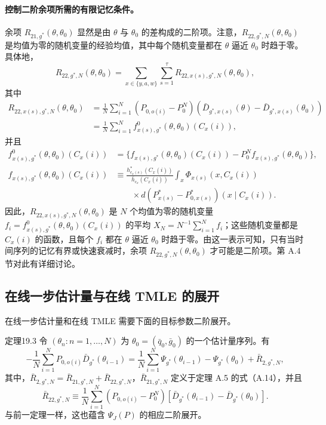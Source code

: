 \paragraph{控制二阶余项所需的有限记忆条件。}
余项 $R_{21,g^*}(\theta,\theta_0)$ 显然是由 $\theta$ 与 $\theta_0$ 的差构成的二阶项。注意，$R_{22,g^*,N}(\theta,\theta_0)$ 是均值为零的随机变量的经验均值，其中每个随机变量都在 $\theta$ 逼近 $\theta_0$ 时趋于零。具体地，
\[
 R_{22,g^*,N}(\theta,\theta_0)
 =\sum_{x\in\{y,a,w\}}\sum_{s=1}^{\tau}
 R_{22,x(s),g^*,N}(\theta,\theta_0),
\]
其中
\[
\begin{aligned}
 R_{22,x(s),g^*,N}(\theta,\theta_0)
 &=\frac1N\sum_{i=1}^N(P_{0,o(i)}-P_0^N)
 (\bar D_{g^*,x(s)}(\theta)-\bar D_{g^*,x(s)}(\theta_0))\\
 &=\frac1N\sum_{i=1}^N f^0_{x(s),g^*}(\theta,\theta_0)(C_x(i)),
\end{aligned}
\]
并且
\[
\begin{aligned}
 f^0_{x(s),g^*}(\theta,\theta_0)(C_x(i))
 &=\{f_{x(s),g^*}(\theta,\theta_0)(C_x(i))
 -P_0^N f_{x(s),g^*}(\theta,\theta_0)\},\\
 f_{x(s),g^*}(\theta,\theta_0)(C_x(i))
 &\equiv\frac{h^*_{c_x(s)}(C_x(i))}{\bar h_{c_x}(C_x(i))}
 \int_x\Phi_{x(s)}(x,C_x(i))\\
 &\qquad\times d(P^*_{x(s)}-P^*_{0,x(s)})(x\mid C_x(i)).
\end{aligned}
\]
因此，$R_{22,x(s),g^*,N}(\theta,\theta_0)$ 是 $N$ 个均值为零的随机变量 $f_i=f^0_{x(s),g^*}(\theta,\theta_0)(C_x(i))$ 的平均 $X_N=N^{-1}\sum_{i=1}^N f_i$；这些随机变量都是 $C_x(i)$ 的函数，且每个 $f_i$ 都在 $\theta$ 逼近 $\theta_0$ 时趋于零。由这一表示可知，只有当时间序列的记忆有界或快速衰减时，余项 $R_{22,g^*,N}(\theta,\theta_0)$ 才可能是二阶项。第 A.4 节对此有详细讨论。

\subsection{在线一步估计量与在线 TMLE 的展开}

在线一步估计量和在线 TMLE 需要下面的目标参数二阶展开。

\begin{bookresult}{定理}{19.3}
令 $(\theta_n:n=1,\ldots,N)$ 为 $\theta_0=(\bar q_0,\bar g_0)$ 的一个估计量序列。有
\[
 -\frac1N\sum_{i=1}^N P_{0,o(i)}\bar D_{g^*}(\theta_{i-1})
 =\frac1N\sum_{i=1}^N\Psi_{g^*}(\theta_{i-1})
 -\Psi_{g^*}(\theta_0)+\bar R_{2,g^*,N},
\]
其中，$\bar R_{2,g^*,N}=\bar R_{21,g^*,N}+\bar R_{22,g^*,N}$，$\bar R_{21,g^*,N}$ 定义于定理 A.5 的式（A.14），并且
\[
 \bar R_{22,g^*,N}
 \equiv\frac1N\sum_{i=1}^N(P_{0,o(i)}-P_0^N)
 [\bar D_{g^*}(\theta_{i-1})-\bar D_{g^*}(\theta_0)].
\]
与前一定理一样，这也蕴含 $\Psi_J(P)$ 的相应二阶展开。
\end{bookresult}

